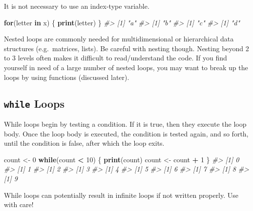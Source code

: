\documentclass[]{book}
\newenvironment{Shaded}{\begin{snugshade}}{\end{snugshade}}
\newcommand{\CommentTok}[1]{\textcolor[rgb]{0.56,0.35,0.01}{\textit{#1}}}
\newcommand{\ControlFlowTok}[1]{\textcolor[rgb]{0.13,0.29,0.53}{\textbf{#1}}}
\newcommand{\DecValTok}[1]{\textcolor[rgb]{0.00,0.00,0.81}{#1}}
\newcommand{\KeywordTok}[1]{\textcolor[rgb]{0.13,0.29,0.53}{\textbf{#1}}}
\newcommand{\NormalTok}[1]{#1}
\newcommand{\OperatorTok}[1]{\textcolor[rgb]{0.81,0.36,0.00}{\textbf{#1}}}
\newcommand{\StringTok}[1]{\textcolor[rgb]{0.31,0.60,0.02}{#1}}
\theoremstyle{definition}
\theoremstyle{definition}
\theoremstyle{definition}
\theoremstyle{remark}
\let\BeginKnitrBlock\begin \let\EndKnitrBlock\end
\begin{document}
It is not necessary to use an index-type variable.

\begin{Shaded}
\begin{Highlighting}[]
\ControlFlowTok{for}\NormalTok{(letter }\ControlFlowTok{in}\NormalTok{ x) \{}
        \KeywordTok{print}\NormalTok{(letter)}
\NormalTok{\}}
\CommentTok{#> [1] "a"}
\CommentTok{#> [1] "b"}
\CommentTok{#> [1] "c"}
\CommentTok{#> [1] "d"}
\end{Highlighting}
\end{Shaded}

\BeginKnitrBlock{rmdtip}
Nested loops are commonly needed for multidimensional or hierarchical
data structures (e.g.~matrices, lists). Be careful with nesting though.
Nesting beyond 2 to 3 levels often makes it difficult to read/understand
the code. If you find yourself in need of a large number of nested
loops, you may want to break up the loops by using functions (discussed
later).
\EndKnitrBlock{rmdtip}

\hypertarget{while-loops}{%
\subsection{\texorpdfstring{\texttt{while}
Loops}{while Loops}}\label{while-loops}}

While loops begin by testing a condition. If it is true, then they
execute the loop body. Once the loop body is executed, the condition is
tested again, and so forth, until the condition is false, after which
the loop exits.

\begin{Shaded}
\begin{Highlighting}[]
\NormalTok{count <-}\StringTok{ }\DecValTok{0}
\ControlFlowTok{while}\NormalTok{(count }\OperatorTok{<}\StringTok{ }\DecValTok{10}\NormalTok{) \{}
        \KeywordTok{print}\NormalTok{(count)}
\NormalTok{        count <-}\StringTok{ }\NormalTok{count }\OperatorTok{+}\StringTok{ }\DecValTok{1}
\NormalTok{\}}
\CommentTok{#> [1] 0}
\CommentTok{#> [1] 1}
\CommentTok{#> [1] 2}
\CommentTok{#> [1] 3}
\CommentTok{#> [1] 4}
\CommentTok{#> [1] 5}
\CommentTok{#> [1] 6}
\CommentTok{#> [1] 7}
\CommentTok{#> [1] 8}
\CommentTok{#> [1] 9}
\end{Highlighting}
\end{Shaded}

\BeginKnitrBlock{rmdwarning}
While loops can potentially result in infinite loops if not written
properly. Use with care!
\EndKnitrBlock{rmdwarning}
\end{document}
